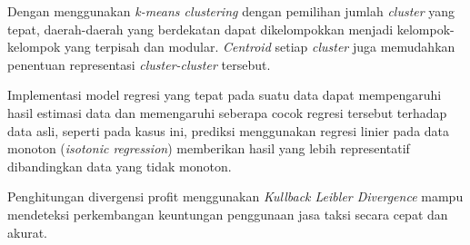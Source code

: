 \documentclass{article}
\begin{document}
Dengan menggunakan \textit{k-means clustering} dengan pemilihan jumlah \textit{cluster} yang tepat, daerah-daerah yang berdekatan dapat dikelompokkan menjadi kelompok-kelompok yang terpisah dan modular. \textit{Centroid} setiap \textit{cluster} juga memudahkan penentuan representasi \textit{cluster-cluster} tersebut.

Implementasi model regresi yang tepat pada suatu data dapat mempengaruhi hasil estimasi data dan memengaruhi seberapa cocok regresi tersebut terhadap data asli, seperti pada kasus ini, prediksi menggunakan regresi linier pada data monoton (\textit{isotonic regression}) memberikan hasil yang lebih representatif dibandingkan data yang tidak monoton.

Penghitungan divergensi profit menggunakan \textit{Kullback Leibler Divergence} mampu mendeteksi perkembangan keuntungan penggunaan jasa taksi secara cepat dan akurat.
\end{document}
